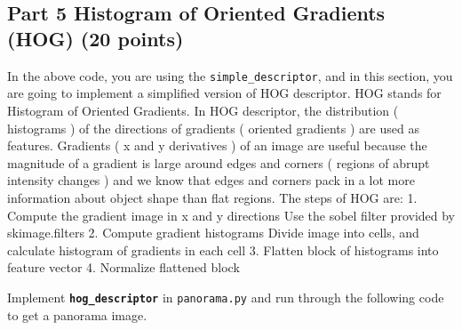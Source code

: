 \documentclass[11pt]{article}
\begin{document}
    \begin{center}
    \end{center}
    { \hspace*{\fill} \\}
    
    \begin{center}
    \end{center}
    { \hspace*{\fill} \\}
    
    \hypertarget{part-5-histogram-of-oriented-gradients-hog-20-points}{%
\subsection{Part 5 Histogram of Oriented Gradients (HOG) (20
points)}\label{part-5-histogram-of-oriented-gradients-hog-20-points}}

In the above code, you are using the \texttt{simple\_descriptor}, and in
this section, you are going to implement a simplified version of HOG
descriptor. HOG stands for Histogram of Oriented Gradients. In HOG
descriptor, the distribution ( histograms ) of the directions of
gradients ( oriented gradients ) are used as features. Gradients ( x and
y derivatives ) of an image are useful because the magnitude of a
gradient is large around edges and corners ( regions of abrupt intensity
changes ) and we know that edges and corners pack in a lot more
information about object shape than flat regions. The steps of HOG are:
1. Compute the gradient image in x and y directions Use the sobel filter
provided by skimage.filters 2. Compute gradient histograms Divide image
into cells, and calculate histogram of gradients in each cell 3. Flatten
block of histograms into feature vector 4. Normalize flattened block

Implement \textbf{\texttt{hog\_descriptor}} in \texttt{panorama.py} and
run through the following code to get a panorama image.
\end{document}
